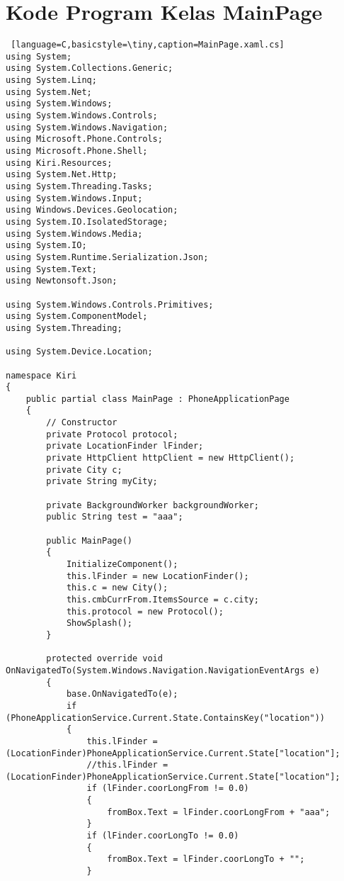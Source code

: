 \chapter{Kode Program Kelas MainPage}
\label{app:A}

\singlespacing 

\begin{lstlisting} [language=C,basicstyle=\tiny,caption=MainPage.xaml.cs]
using System;
using System.Collections.Generic;
using System.Linq;
using System.Net;
using System.Windows;
using System.Windows.Controls;
using System.Windows.Navigation;
using Microsoft.Phone.Controls;
using Microsoft.Phone.Shell;
using Kiri.Resources;
using System.Net.Http;
using System.Threading.Tasks;
using System.Windows.Input;
using Windows.Devices.Geolocation;
using System.IO.IsolatedStorage;
using System.Windows.Media;
using System.IO;
using System.Runtime.Serialization.Json;
using System.Text;
using Newtonsoft.Json;

using System.Windows.Controls.Primitives;
using System.ComponentModel;
using System.Threading;

using System.Device.Location; 

namespace Kiri
{
    public partial class MainPage : PhoneApplicationPage
    {
        // Constructor
        private Protocol protocol;
        private LocationFinder lFinder;
        private HttpClient httpClient = new HttpClient();
        private City c;
        private String myCity;

        private BackgroundWorker backgroundWorker;
        public String test = "aaa";
        
        public MainPage()
        {
            InitializeComponent();
            this.lFinder = new LocationFinder();
            this.c = new City();
            this.cmbCurrFrom.ItemsSource = c.city;
            this.protocol = new Protocol();
            ShowSplash();
        }

        protected override void OnNavigatedTo(System.Windows.Navigation.NavigationEventArgs e)
        {
            base.OnNavigatedTo(e);
            if (PhoneApplicationService.Current.State.ContainsKey("location"))
            {
                this.lFinder = (LocationFinder)PhoneApplicationService.Current.State["location"];
                //this.lFinder = (LocationFinder)PhoneApplicationService.Current.State["location"];
                if (lFinder.coorLongFrom != 0.0)
                {
                    fromBox.Text = lFinder.coorLongFrom + "aaa";
                }
                if (lFinder.coorLongTo != 0.0)
                {
                    fromBox.Text = lFinder.coorLongTo + "";
                }
                

\end{lstlisting}

